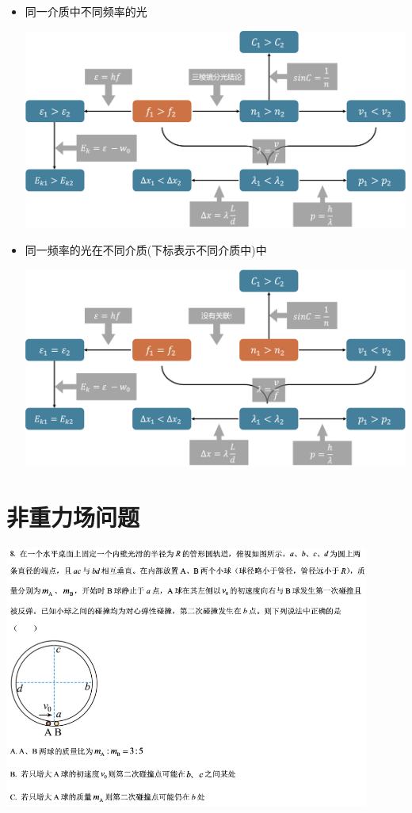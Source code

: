 \documentclass{article}
\begin{document}
\begin{itemize}
    \item 同一介质中不同频率的光

          \vspace*{1em}
          \includegraphics[width=35em,keepaspectratio]{./pictures/22.png}

          \vspace*{2em}

    \item 同一频率的光在不同介质(下标表示不同介质中)中

          \vspace*{1em}
          \includegraphics[width=35em,keepaspectratio]{./pictures/23.png}
\end{itemize}

\vspace{5em}

\section{非重力场问题}
\includegraphics[width = 0.9\textwidth]{./pictures/21-1.png}
\end{document}
